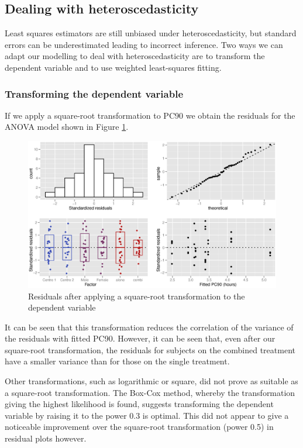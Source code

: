 \subsection{Dealing with heteroscedasticity}
Least squares estimators are still unbiased under heteroscedasticity\cite{long}, but standard errors can be underestimated leading to incorrect inference. Two ways we can adapt our modelling to deal with heteroscedasticity are to transform the dependent variable and to use weighted least-squares fitting.

\subsubsection*{Transforming the dependent variable}
If we apply a square-root transformation to PC90 we obtain the residuals for the ANOVA model shown in Figure \ref{aovsqrtres}.
\begin{figure}[h]
\includegraphics[width=150mm]{aovsqrtres.eps} 
\caption{Residuals after applying a square-root transformation to the dependent variable}
\label{aovsqrtres}
\end{figure}
It can be seen that this transformation reduces the correlation of the variance of the residuals with fitted PC90. However, it can be seen that, even after our square-root transformation, the residuals for subjects on the combined treatment have a smaller variance than for those on the single treatment.%

Other transformations, such as logarithmic or square, did not prove as suitable as a square-root transformation. The Box-Cox method, whereby the transformation giving the highest likelihood is found, suggests transforming the dependent variable by raising it to the power 0.3 is optimal. This did not appear to give a noticeable improvement over the square-root transformation (power 0.5) in residual plots however. 

